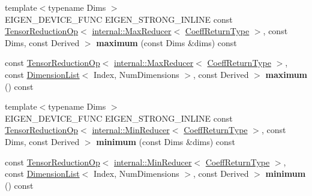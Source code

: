 \begin{DoxyCompactItemize}
\item 
\mbox{\label{class_eigen_1_1_tensor_base_3_01_derived_00_01_read_only_accessors_01_4_a5bac6ba53fc93b4c69e66603fd66b52e}} 
{\footnotesize template$<$typename Dims $>$ }\\E\+I\+G\+E\+N\+\_\+\+D\+E\+V\+I\+C\+E\+\_\+\+F\+U\+NC E\+I\+G\+E\+N\+\_\+\+S\+T\+R\+O\+N\+G\+\_\+\+I\+N\+L\+I\+NE const \hyperlink{class_eigen_1_1_tensor_reduction_op}{Tensor\+Reduction\+Op}$<$ \hyperlink{struct_eigen_1_1internal_1_1_max_reducer}{internal\+::\+Max\+Reducer}$<$ \hyperlink{group___sparse_core___module}{Coeff\+Return\+Type} $>$, const Dims, const Derived $>$ {\bfseries maximum} (const Dims \&dims) const
\item 
\mbox{\label{class_eigen_1_1_tensor_base_3_01_derived_00_01_read_only_accessors_01_4_a27ca8f393752b137d6bf1f076f3343dc}} 
const \hyperlink{class_eigen_1_1_tensor_reduction_op}{Tensor\+Reduction\+Op}$<$ \hyperlink{struct_eigen_1_1internal_1_1_max_reducer}{internal\+::\+Max\+Reducer}$<$ \hyperlink{group___sparse_core___module}{Coeff\+Return\+Type} $>$, const \hyperlink{struct_eigen_1_1_dimension_list}{Dimension\+List}$<$ Index, Num\+Dimensions $>$, const Derived $>$ {\bfseries maximum} () const
\item 
\mbox{\label{class_eigen_1_1_tensor_base_3_01_derived_00_01_read_only_accessors_01_4_aa447260519ab5b5ea0ddb24edce5d512}} 
{\footnotesize template$<$typename Dims $>$ }\\E\+I\+G\+E\+N\+\_\+\+D\+E\+V\+I\+C\+E\+\_\+\+F\+U\+NC E\+I\+G\+E\+N\+\_\+\+S\+T\+R\+O\+N\+G\+\_\+\+I\+N\+L\+I\+NE const \hyperlink{class_eigen_1_1_tensor_reduction_op}{Tensor\+Reduction\+Op}$<$ \hyperlink{struct_eigen_1_1internal_1_1_min_reducer}{internal\+::\+Min\+Reducer}$<$ \hyperlink{group___sparse_core___module}{Coeff\+Return\+Type} $>$, const Dims, const Derived $>$ {\bfseries minimum} (const Dims \&dims) const
\item 
\mbox{\label{class_eigen_1_1_tensor_base_3_01_derived_00_01_read_only_accessors_01_4_a6c14f14c81a00147e95863f08dbfa814}} 
const \hyperlink{class_eigen_1_1_tensor_reduction_op}{Tensor\+Reduction\+Op}$<$ \hyperlink{struct_eigen_1_1internal_1_1_min_reducer}{internal\+::\+Min\+Reducer}$<$ \hyperlink{group___sparse_core___module}{Coeff\+Return\+Type} $>$, const \hyperlink{struct_eigen_1_1_dimension_list}{Dimension\+List}$<$ Index, Num\+Dimensions $>$, const Derived $>$ {\bfseries minimum} () const

\end{DoxyCompactItemize}
